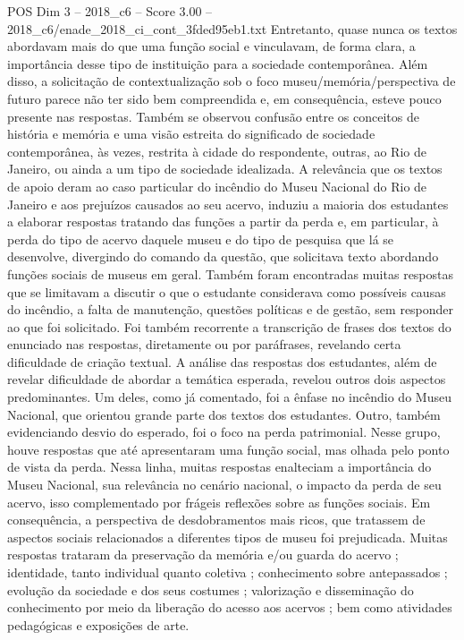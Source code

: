 \begin{textsample}{POS Dim 3 – 2018\_c6 – Score 3.00 – 2018\_c6/enade\_2018\_ci\_cont\_3fded95eb1.txt}
Entretanto, quase nunca os textos abordavam mais do que uma função social e vinculavam, de forma clara, a importância desse tipo de instituição para a sociedade contemporânea.
Além disso, a solicitação de contextualização sob o foco museu/memória/perspectiva de futuro parece não ter sido bem compreendida e, em consequência, esteve pouco presente nas respostas.
Também se observou confusão entre os conceitos de história e memória e uma visão estreita do significado de sociedade contemporânea, às vezes, restrita à cidade do respondente, outras, ao Rio de Janeiro, ou ainda a um tipo de sociedade idealizada.
A relevância que os textos de apoio deram ao caso particular do incêndio do Museu Nacional do Rio de Janeiro e aos prejuízos causados ao seu acervo, induziu a maioria dos estudantes a elaborar respostas tratando das funções a partir da perda e, em particular, à perda do tipo de acervo daquele museu e do tipo de pesquisa que lá se desenvolve, divergindo do comando da questão, que solicitava texto abordando funções sociais de museus em geral.
Também foram encontradas muitas respostas que se limitavam a discutir o que o estudante considerava como possíveis causas do incêndio, a falta de manutenção, questões políticas e de gestão, sem responder ao que foi solicitado.
Foi também recorrente a transcrição de frases dos textos do enunciado nas respostas, diretamente ou por paráfrases, revelando certa dificuldade de criação textual.
A análise das respostas dos estudantes, além de revelar dificuldade de abordar a temática esperada, revelou outros dois aspectos predominantes.
Um deles, como já comentado, foi a ênfase no incêndio do Museu Nacional, que orientou grande parte dos textos dos estudantes.
Outro, também evidenciando desvio do esperado, foi o foco na perda patrimonial.
Nesse grupo, houve respostas que até apresentaram uma função social, mas olhada pelo ponto de vista da perda.
Nessa linha, muitas respostas enalteciam a importância do Museu Nacional, sua relevância no cenário nacional, o impacto da perda de seu acervo, isso complementado por frágeis reflexões sobre as funções sociais.
Em consequência, a perspectiva de desdobramentos mais ricos, que tratassem de aspectos sociais relacionados a diferentes tipos de museu foi prejudicada.
Muitas respostas trataram da preservação da memória e/ou guarda do acervo ; identidade, tanto individual quanto coletiva ; conhecimento sobre antepassados ; evolução da sociedade e dos seus costumes ; valorização e disseminação do conhecimento por meio da liberação do acesso aos acervos ; bem como atividades pedagógicas e exposições de arte.

\end{textsample}
